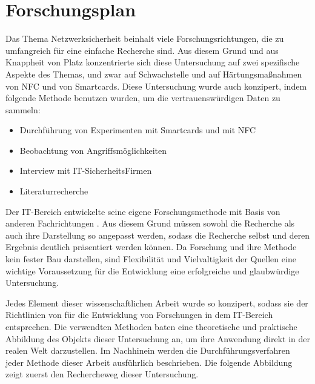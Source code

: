 \section{Forschungsplan}

Das Thema Netzwerksicherheit beinhalt viele Forschungsrichtungen, die zu umfangreich für eine einfache
Recherche sind. Aus diesem Grund und aus Knappheit von Platz konzentrierte sich diese Untersuchung auf zwei
spezifische Aspekte des Themas, und zwar auf Schwachstelle und auf Härtungsmaßnahmen von NFC und von Smartcards.
Diese Untersuchung wurde auch konzipert, indem folgende Methode benutzen wurden, um die vertrauenswürdigen
Daten zu sammeln:

\begin{itemize}
  \item Durchführung von Experimenten mit Smartcards und mit NFC
  \item Beobachtung von Angriffsmöglichkeiten
  \item Interview mit IT-SicherheitsFirmen
  \item Literaturrecherche
\end{itemize}

Der IT-Bereich entwickelte seine eigene Forschungsmethode mit Basis von anderen Fachrichtungen \cite{inbook:AHDS}.
Aus diesem Grund müssen sowohl die Recherche als auch ihre Darstellung so angepasst werden, sodass die Recherche selbst
und deren Ergebnis deutlich präsentiert werden können. Da Forschung und ihre Methode kein fester Bau darstellen, 
sind Flexibilität und Vielvaltigkeit der Quellen eine wichtige Voraussetzung für die Entwicklung eine erfolgreiche und
glaubwürdige Untersuchung.


Jedes Element dieser wissenschaftlichen Arbeit wurde so konzipert, sodass sie der Richtlinien von \cite{refip:SGRM} für 
die Entwicklung von Forschungen in dem IT-Bereich entsprechen. Die verwendten Methoden baten eine theoretische
und praktische Abbildung des Objekts dieser Untersuchung an, um ihre Anwendung direkt in der realen Welt darzustellen. 
Im Nachhinein werden die Durchführungsverfahren jeder Methode dieser Arbeit ausführlich beschrieben. Die folgende Abbildung 
zeigt zuerst den Rechercheweg dieser Untersuchung.

